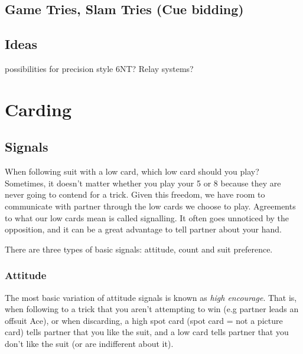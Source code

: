\documentclass[a4paper]{report}
\theoremstyle{question}
\theoremstyle{theorem}
\theoremstyle{definition}
\newcommand{\<}{\left\langle}%
\renewcommand{\>}{\right\rangle}%
\begin{document}
\section*{Game Tries, Slam Tries (Cue bidding)}
\section*{Ideas}
possibilities for precision style 6NT? Relay systems?



\chapter*{Carding}

\section*{Signals}

When following suit with a low card, which low card should you play? Sometimes, it doesn't matter whether you play your 5 or 8 because they are never going to contend for a trick. Given this freedom, we have room to communicate with partner through the low cards we choose to play. Agreements to what our low cards mean is called signalling. It often goes unnoticed by the opposition, and it can be a great advantage to tell partner about your hand.

There are three types of basic signals: attitude, count and suit preference.

\subsection*{Attitude}

The most basic variation of attitude signals is known as \textit{high encourage}. That is, when following to a trick that you aren't attempting to win (e.g partner leads an offsuit Ace), or when discarding, a high spot card (spot card = not a picture card) tells partner that you like the suit, and a low card tells partner that you don't like the suit (or are indifferent about it). 

\end{document}
